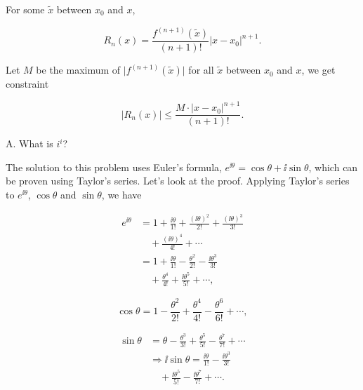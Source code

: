 For some $\tilde{x}$ between $x_0$ and $x$,

\[
  R_n(x)=\frac{f^{(n+1)}(\tilde{x})}{(n+1)!}\lvert x-x_0\rvert^{n+1}.
\]

Let $M$ be the maximum of $\lvert f^{(n+1)}(\tilde{x})\rvert$ for all $\tilde{x}$ between
$x_0$ and $x$, we get constraint

\[
  \lvert R_n(x)\rvert\leq\frac{M\cdot\lvert x-x_0\rvert^{n+1}}{(n+1)!}.
\]

\begin{problem}{A. What is $i^i$?}
\end{problem}

\begin{solution}
The solution to this problem uses Euler's formula, $e^{\ii\theta}=\cos\theta+\ii\sin\theta$,
which can be proven using Taylor's series. Let's look at the proof. Applying Taylor's series to
$e^{\ii\theta}$, $\cos\theta$ and $\sin\theta$, we have

\[
  \begin{aligned}
  e^{\ii\theta}&=1+\frac{\ii\theta}{1!}+\frac{(\ii\theta)^2}{2!}+\frac{(\ii\theta)^3}{3!}\\
  &\quad+\frac{(\ii\theta)^4}{4!}+\cdots\\
  &=1+\frac{\ii\theta}{1!}-\frac{\theta^2}{2!}-\frac{\ii\theta^3}{3!}\\
  &\quad+\frac{\theta^4}{4!}+\frac{\ii\theta^5}{5!}+\cdots,
  \end{aligned}
\]

\[
  \cos\theta=1-\frac{\theta^2}{2!}+\frac{\theta^4}{4!}-\frac{\theta^6}{6!}+\cdots,
\]

\[
  \begin{aligned}
  \sin\theta&=\theta-\frac{\theta^3}{3!}+\frac{\theta^5}{5!}-\frac{\theta^7}{7!}+\cdots\\
  &\Rightarrow \ii\sin\theta=\frac{\ii\theta}{1!}-\frac{\ii\theta^3}{3!}\\
  &\quad+\frac{\ii\theta^5}{5!}-\frac{\ii\theta^7}{7!}+\cdots.
\end{aligned}
\]
\end{solution}
